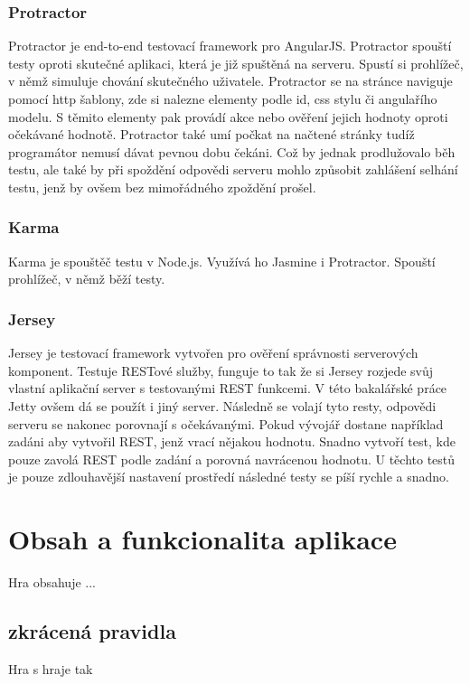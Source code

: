 \documentclass[czech,master,public,dept460,male,cpdeclaration,twoside]{diploma}
\begin{document}
\subsubsection{Protractor}
Protractor je end-to-end testovací framework pro AngularJS. Protractor spouští testy oproti skutečné aplikaci, která je již spuštěná na serveru. Spustí si prohlížeč, v němž simuluje chování skutečného uživatele. Protractor se na stránce naviguje pomocí http šablony, zde si nalezne elementy podle id, css stylu či angulařího modelu. S těmito elementy pak provádí akce nebo ověření jejich hodnoty oproti očekávané hodnotě. Protractor také umí počkat na načtené stránky tudíž programátor nemusí dávat pevnou dobu čekáni. Což by jednak prodlužovalo běh testu, ale také by při spoždění odpovědi serveru mohlo způsobit zahlášení selhání testu, jenž by ovšem bez mimořádného zpoždění prošel. \cite{TestingAngularApp}

\subsubsection{Karma}
Karma je spouštěč testu v Node.js. Využívá ho Jasmine i Protractor. Spouští prohlížeč, v němž běží testy.

\subsubsection{Jersey}
Jersey je testovací framework vytvořen pro ověření správnosti serverových komponent. Testuje RESTové služby, funguje to tak že si Jersey rozjede svůj vlastní aplikační server s testovanými REST funkcemi. V této bakalářské práce Jetty ovšem dá se použít i jiný server. Následně se volají tyto resty, odpovědi serveru se nakonec porovnají s očekávanými. Pokud vývojář dostane například zadáni aby vytvořil REST, jenž vrací nějakou hodnotu. Snadno vytvoří test, kde pouze zavolá REST podle zadání a porovná navrácenou hodnotu. U těchto testů je pouze zdlouhavější nastavení prostředí následné testy se píší rychle a snadno.

\section{Obsah a funkcionalita aplikace}
Hra obsahuje  ...

\subsection{zkrácená pravidla}
Hra s hraje tak
\end{document}
